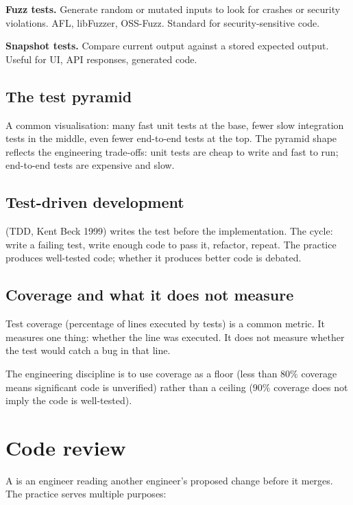 \textbf{Fuzz tests.} Generate random or mutated inputs to look for crashes or security violations. AFL, libFuzzer, OSS-Fuzz. Standard for security-sensitive code.

\textbf{Snapshot tests.} Compare current output against a stored expected output. Useful for UI, API responses, generated code.

\subsection{The test pyramid}

A common visualisation: many fast unit tests at the base, fewer slow integration tests in the middle, even fewer end-to-end tests at the top. The pyramid shape reflects the engineering trade-offs: unit tests are cheap to write and fast to run; end-to-end tests are expensive and slow.

\subsection{Test-driven development}

 (TDD, Kent Beck 1999) writes the test before the implementation. The cycle: write a failing test, write enough code to pass it, refactor, repeat. The practice produces well-tested code; whether it produces better code is debated.

\subsection{Coverage and what it does not measure}

Test coverage (percentage of lines executed by tests) is a common metric. It measures one thing: whether the line was executed. It does not measure whether the test would catch a bug in that line.

The engineering discipline is to use coverage as a floor (less than $80\%$ coverage means significant code is unverified) rather than a ceiling ($90\%$ coverage does not imply the code is well-tested).

\section{Code review}

A  is an engineer reading another engineer's proposed change before it merges. The practice serves multiple purposes:

